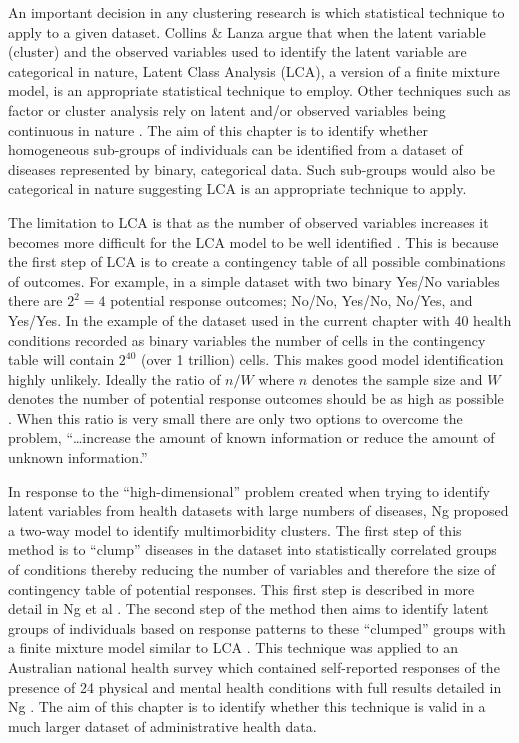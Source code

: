 \documentclass[12pt,]{report}
\begin{document}
An important decision in any clustering research is which statistical
technique to apply to a given dataset. Collins \& Lanza
\citeyearpar{RN291} argue that when the latent variable (cluster) and
the observed variables used to identify the latent variable are
categorical in nature, Latent Class Analysis (LCA), a version of a
finite mixture model, is an appropriate statistical technique to employ.
Other techniques such as factor or cluster analysis rely on latent
and/or observed variables being continuous in nature \citep{RN291}. The
aim of this chapter is to identify whether homogeneous sub-groups of
individuals can be identified from a dataset of diseases represented by
binary, categorical data. Such sub-groups would also be categorical in
nature suggesting LCA is an appropriate technique to apply.

The limitation to LCA is that as the number of observed variables
increases it becomes more difficult for the LCA model to be well
identified \citep{RN291}. This is because the first step of LCA is to
create a contingency table of all possible combinations of outcomes. For
example, in a simple dataset with two binary Yes/No variables there are
\(2^{2} = 4\) potential response outcomes; No/No, Yes/No, No/Yes, and
Yes/Yes. In the example of the dataset used in the current chapter with
40 health conditions recorded as binary variables the number of cells in
the contingency table will contain \(2^{40}\) (over 1 trillion) cells.
This makes good model identification highly unlikely. Ideally the ratio
of \(n/W\) where \(n\) denotes the sample size and \(W\) denotes the
number of potential response outcomes should be as high as possible
\citep{RN291}. When this ratio is very small there are only two options
to overcome the problem, ``\ldots{}increase the amount of known
information or reduce the amount of unknown information.'' \citep[
:93]{RN291}

In response to the ``high-dimensional'' problem created when trying to
identify latent variables from health datasets with large numbers of
diseases, Ng \citeyearpar{RN72} proposed a two-way model to identify
multimorbidity clusters. The first step of this method is to ``clump''
diseases in the dataset into statistically correlated groups of
conditions thereby reducing the number of variables and therefore the
size of contingency table of potential responses. This first step is
described in more detail in Ng et al \citeyearpar{RN225}. The second
step of the method then aims to identify latent groups of individuals
based on response patterns to these ``clumped'' groups with a finite
mixture model similar to LCA \citep{RN72}. This technique was applied to
an Australian national health survey which contained self-reported
responses of the presence of 24 physical and mental health conditions
with full results detailed in Ng \citeyearpar{RN72}. The aim of this
chapter is to identify whether this technique is valid in a much larger
dataset of administrative health data.
\end{document}
